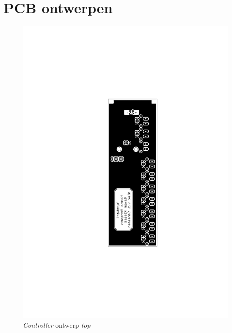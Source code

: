 \chapter{PCB ontwerpen}
\label{app:launcher-pcb}

\begin{figure}
    \includegraphics[scale=0.75]{figures/controller_top.pdf}
    \caption{\emph{Controller} ontwerp \emph{top}}
\end{figure}

